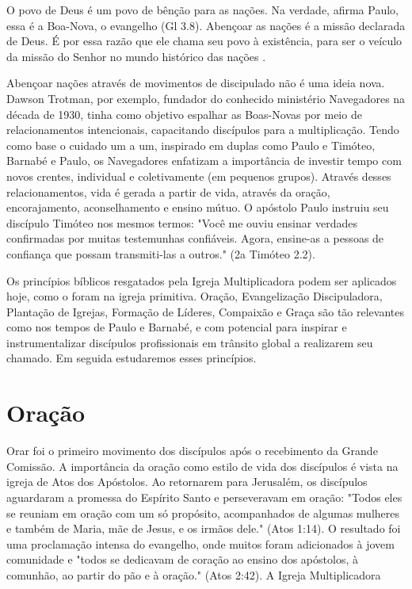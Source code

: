 \documentclass[12pt,openright,oneside,a4paper,
english,french,spanish,brazil]{abntex2}
\begin{document}
\begin{citacao}O povo de Deus é um povo de bênção para as nações. Na verdade, afirma Paulo, essa é a Boa-Nova, o evangelho (Gl 3.8). Abençoar as nações é a missão declarada de Deus. É por essa razão que ele chama seu povo à existência, para ser o veículo da missão do Senhor no mundo histórico das nações \cite[p. 98]{wright_missao_2012}.\end{citacao}

Abençoar nações através de movimentos de discipulado não é uma ideia nova. Dawson Trotman, por exemplo, fundador do conhecido ministério Navegadores na década de 1930, tinha como objetivo espalhar as Boas-Novas por meio de relacionamentos intencionais, capacitando discípulos para a multiplicação. Tendo como base o cuidado um a um, inspirado em duplas como Paulo e Timóteo, Barnabé e Paulo, os Navegadores enfatizam a importância de investir tempo com novos crentes, individual e coletivamente (em pequenos grupos). Através desses relacionamentos, vida é gerada a partir de vida, através da oração, encorajamento, aconselhamento e ensino mútuo\cite[p. 21]{freitas}. O apóstolo Paulo instruiu seu discípulo Timóteo nos mesmos termos: "Você me ouviu ensinar verdades confirmadas por muitas testemunhas confiáveis. Agora, ensine-as a pessoas de confiança que possam transmiti-las a outros." (2a Timóteo 2.2).

Os princípios bíblicos resgatados pela Igreja Multiplicadora podem ser aplicados hoje, como o foram na igreja primitiva. Oração, Evangelização Discipuladora, Plantação de Igrejas, Formação de Líderes, Compaixão e Graça são tão relevantes como nos tempos de Paulo e Barnabé, e com potencial para inspirar e instrumentalizar discípulos profissionais em trânsito global a realizarem seu chamado. Em seguida estudaremos esses princípios.


\section{Oração}

Orar foi o primeiro movimento dos discípulos após o recebimento da Grande Comissão\cite[p. 28]{brandao}. A importância da oração como estilo de vida dos discípulos é vista na igreja de Atos dos Apóstolos. Ao retornarem para Jerusalém, os discípulos aguardaram a promessa do Espírito Santo e perseveravam em oração: "Todos eles se reuniam em oração com um só propósito, acompanhados de algumas mulheres e também de Maria, mãe de Jesus, e os irmãos dele." (Atos 1:14). O resultado foi uma proclamação intensa do evangelho, onde muitos foram adicionados à jovem comunidade e "todos se dedicavam de coração ao ensino dos apóstolos, à comunhão, ao partir do pão e à oração." (Atos 2:42). A Igreja Multiplicadora 
\end{document}
